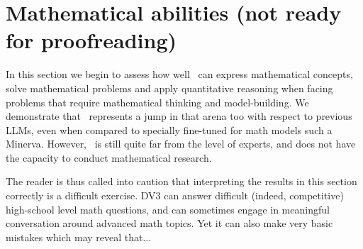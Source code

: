 
\section{Mathematical abilities (not ready for proofreading)}
\label{sec:math}


In this section we begin to assess how well \DV \ can express mathematical concepts, solve mathematical problems and apply quantitative reasoning when facing problems that require mathematical thinking and model-building. We demonstrate that \DV \ represents a jump in that arena too with respect to previous LLMs, even when compared to specially fine-tuned for math models such a Minerva. However, \DV \ is still quite far from the level of experts, and does not have the capacity to conduct mathematical research. 

\iffalse`
In fact, we will see that while \DV \ shows high proficiency in problem-solving, it does quite badly when pushed outside of the 

We contrast \DV's mathematical reasoning and problem solving skills with those of the previous LLMs and demonstrate that, despite not having the capacities required to conduct mathematical research, \textbf{it has advanced considerably} towards reaching human-level mathematical reasoning ability.

We hypothesize that this is due to a combination of "naive" attention mistakes, where the model sometimes forgets an important term (e.g., an exponent is removed), and also more fundamental limitations due to its "linear thinking" as a next-token prediction machine. We explore the latter issue in more details in the next main section. For the former problem we believe that further training could alleviate the issue, as evidenced by the super-human coding abilities where such attention mistakes would also be fatal, and a key difference is that most likely DV3 was trained on much more code than mathematics data. 

Large language models may learn to generate fluent and relevant texts for some tasks, such as summarization, translation, or dialogue, but at the same time struggle to produce accurate and rigorous texts for mathematical problems, such as proofs, explanations, or word problems. This may be partly because the training data for math is less diverse, but it could also reflect a deeper difficulty in handling tasks that demand rigor, complex reasoning, and careful attention to a large number of objects and quantifiers. Moreover, math requires a high level of abstraction, precision, and coherence that natural language often does not.
\fi
The reader is thus called into caution that interpreting the results in this section correctly is a difficult exercise. DV3 can answer difficult (indeed, competitive) high-school level math questions, and can sometimes engage in meaningful conversation around advanced math topics. Yet it can also make very basic mistakes which may reveal that...

